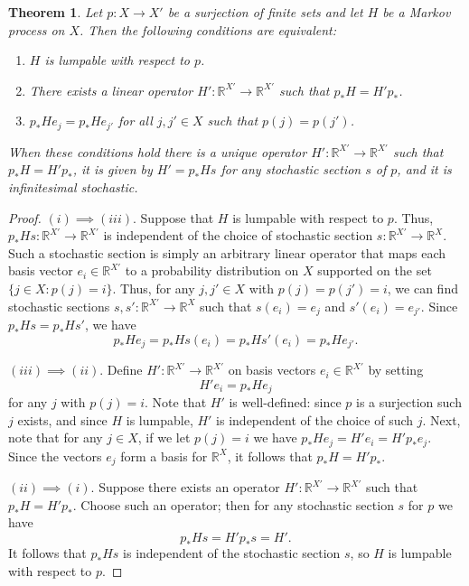 \documentclass[oneside,final]{ucr}
\newtheorem{theorem}{Theorem}[section]
\theoremstyle{definition}
\newcommand{\maps}{\colon}
\newcommand{\R}{\mathbb{R}}
\begin{document}
{\begin{theorem}
\label{thm:lumpability}
Let $p \maps X \to X'$ be a surjection of finite sets and let $H$ be a Markov process on $X$.  Then the following conditions are equivalent:
\begin{enumerate}
\item $H$ is lumpable with respect to $p$.
\item There exists a linear operator $H' \maps \R^{X'} \to \R^{X'}$ such that $p_* H = H' p_*$.
\item $p_* H e_j = p_* H e_{j'}$ for all $j,j' \in X$ such that $p(j)=p(j')$.   
\end{enumerate}
When these conditions hold there is a unique operator $H' \maps \R^{X'} \to \R^{X'}$ 
such that $p_* H = H' p_*$, it is given by $H' = p_* H s$ for any stochastic section $s$ of $p$, and it is infinitesimal stochastic.
\end{theorem}

\begin{proof}
$(i) \implies (iii)$.    Suppose that $H$ is lumpable with respect to $p$.  Thus, $p_* H s \maps \R^{X'} \to \R^{X'}$ is independent of the choice of stochastic section $s \maps \R^{X'} \to \R^X$.    Such a stochastic section is simply an arbitrary linear operator that maps each basis vector $e_i \in \R^{X'}$ to a probability distribution on $X$ supported on the set $\{j \in X: p(j) = i\}$.   Thus, for any $j,j' \in X$ with $p(j)=p(j')=i$, we can find stochastic sections $s,s' \maps \R^{X'} \to \R^X$ such that $s(e_i) = e_j$ and $s'(e_i)=e_{j'}$.   Since $p_* Hs = p_* Hs'$, we have
\[  p_* H e_j = p_* Hs(e_i)=p_* Hs'(e_i) = p_* H e_{j'}. \]

$(iii) \implies (ii)$.  Define $H' \maps \R^{X'} \to \R^{X'}$ on basis vectors
$e_i \in \R^{X'}$ by setting 
\[      H' e_i = p_* H e_j \]
for any $j$ with $p(j)=i$.   Note that $H'$ is well-defined: since $p$ is a surjection such $j$ exists, and since $H$ is lumpable, $H'$ is independent of the choice of such $j$.    Next, note that for any $j \in X$, if we let $p(j) = i$ we have $p_* H e_j = H' e_i = H' p_* e_j$.  Since the vectors $e_j$ form a basis for $\R^X$, it follows that $p_* H = H' p_*$.

$(ii) \implies (i)$.    Suppose there exists an operator $H' \maps \R^{X'} \to \R^{X'}$ such that $p_* H = H' p_*$.  Choose such an operator; then for any stochastic section $s$ for $p$ we have
\[    p_* Hs = H'p_* s = H' .\]
It follows that $p_* Hs$ is independent of the stochastic section $s$, so $H$ is lumpable with respect to $p$.


\end{proof}}
\end{document}
